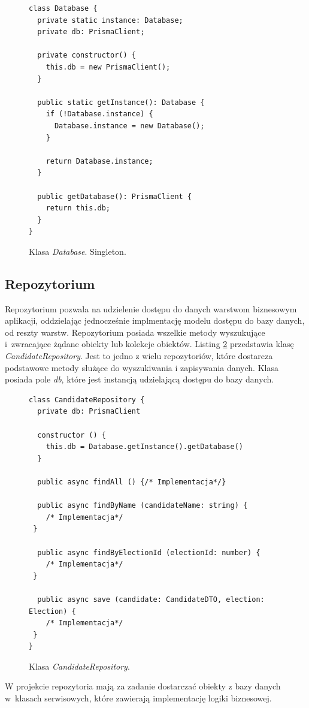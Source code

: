 \documentclass[a4paper,12pt]{book}
\begin{document}
\begin{figure} [H]
  \centering
\begin{lstlisting}[style=ES6]
class Database {
  private static instance: Database;
  private db: PrismaClient;

  private constructor() {
    this.db = new PrismaClient();
  }

  public static getInstance(): Database {
    if (!Database.instance) {
      Database.instance = new Database();
    }

    return Database.instance;
  }

  public getDatabase(): PrismaClient {
    return this.db;
  }
}
\end{lstlisting}
\caption{Klasa \textit{Database}. Singleton.}
\label{singleton}
\end{figure}

\subsection{Repozytorium}

Repozytorium pozwala na udzielenie dostępu do danych warstwom biznesowym aplikacji, oddzielając jednocześnie implmentację modelu dostępu do bazy danych, od reszty warstw. Repozytorium posiada wszelkie metody wyszukujące i~zwracające żądane obiekty lub kolekcje obiektów. Listing \ref{repo} przedstawia klasę \textit{CandidateRepository}. Jest to jedno z wielu repozytoriów, które dostarcza podstawowe metody służące do wyszukiwania i zapisywania danych. Klasa posiada pole \textit{db}, które jest instancją udzielającą dostępu do bazy danych.

\begin{figure}[H]
  \centering
\begin{lstlisting}[style=ES6]
class CandidateRepository {
  private db: PrismaClient

  constructor () {
    this.db = Database.getInstance().getDatabase()
  }

  public async findAll () {/* Implementacja*/}

  public async findByName (candidateName: string) {
	/* Implementacja*/
 }

  public async findByElectionId (electionId: number) {
	/* Implementacja*/
 }

  public async save (candidate: CandidateDTO, election: Election) {
	/* Implementacja*/
 }
}
\end{lstlisting}
\caption{Klasa \textit{CandidateRepository}.}
\label{repo}
\end{figure}
W projekcie repozytoria mają za zadanie dostarczać obiekty z bazy danych w~klasach serwisowych, które zawierają implementację logiki biznesowej.
\end{document}
